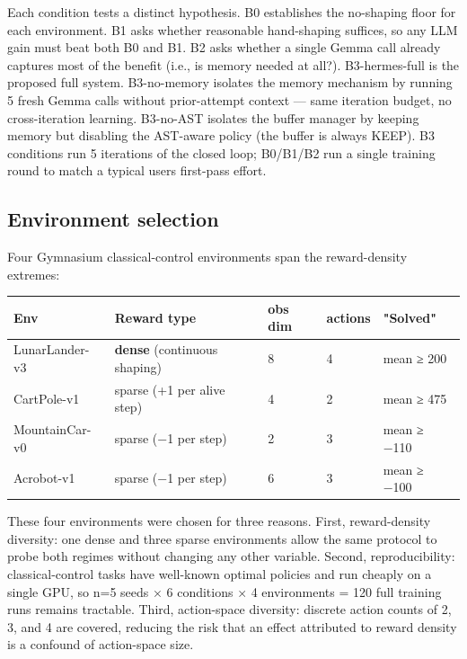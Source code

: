 \documentclass[conference,letterpaper,10pt]{IEEEtran}
\begin{document}
Each condition tests a distinct hypothesis. B0 establishes the no-shaping floor for each environment. B1 asks whether reasonable hand-shaping suffices, so any LLM gain must beat both B0 and B1. B2 asks whether a single Gemma call already captures most of the benefit (i.e., is memory needed at all?). B3-hermes-full is the proposed full system. B3-no-memory isolates the memory mechanism by running 5 fresh Gemma calls without prior-attempt context --- same iteration budget, no cross-iteration learning. B3-no-AST isolates the buffer manager by keeping memory but disabling the AST-aware policy (the buffer is always KEEP). B3 conditions run 5 iterations of the closed loop; B0/B1/B2 run a single training round to match a typical user\textquotesingle s first-pass effort.

\subsection{Environment selection}

Four Gymnasium classical-control environments span the reward-density extremes:

\begin{table}[t]
\centering
\small
\begin{tabular}{@{}lllll@{}}
\toprule
Env & Reward type & obs dim & actions & "Solved" \\
\midrule
LunarLander-v3 & \textbf{dense} (continuous shaping) & 8 & 4 & mean ≥ 200 \\
CartPole-v1 & sparse (+1 per alive step) & 4 & 2 & mean ≥ 475 \\
MountainCar-v0 & sparse (−1 per step) & 2 & 3 & mean ≥ −110 \\
Acrobot-v1 & sparse (−1 per step) & 6 & 3 & mean ≥ −100 \\
\bottomrule
\end{tabular}
\end{table}


These four environments were chosen for three reasons. First, reward-density diversity: one dense and three sparse environments allow the same protocol to probe both regimes without changing any other variable. Second, reproducibility: classical-control tasks have well-known optimal policies and run cheaply on a single GPU, so n=5 seeds × 6 conditions × 4 environments = 120 full training runs remains tractable. Third, action-space diversity: discrete action counts of 2, 3, and 4 are covered, reducing the risk that an effect attributed to reward density is a confound of action-space size.
\end{document}
